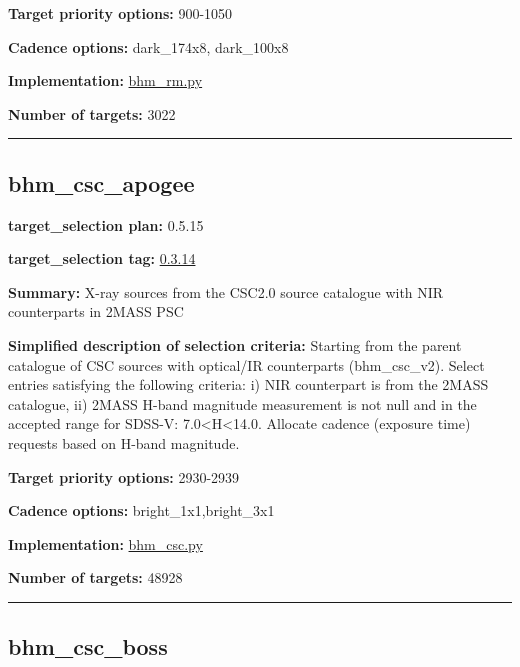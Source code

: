 \noindent\textbf{Target priority options:} 900-1050

\noindent\textbf{Cadence options:} dark\_174x8, dark\_100x8

\noindent\textbf{Implementation:}
\href{https://github.com/sdss/target_selection/blob/0.3.0/python/target_selection/cartons/bhm_rm.py}{bhm\_rm.py}

\noindent\textbf{Number of targets:} 3022

\begin{center}\rule{0.5\linewidth}{0.5pt}\end{center}

\hypertarget{bhm_csc_apogee_plan0.5.15}{%
\subsection{bhm\_csc\_apogee}\label{bhm_csc_apogee_plan0.5.15}}

\noindent\textbf{target\_selection plan:} 0.5.15

\noindent\textbf{target\_selection tag:}
\href{https://github.com/sdss/target_selection/tree/0.3.14/}{0.3.14}

\noindent\textbf{Summary:} X-ray sources from the CSC2.0 source catalogue with
NIR counterparts in 2MASS PSC

\noindent\textbf{Simplified description of selection criteria:} Starting from the
parent catalogue of CSC sources with optical/IR counterparts
(bhm\_csc\_v2). Select entries satisfying the following criteria: i) NIR
counterpart is from the 2MASS catalogue, ii) 2MASS H-band magnitude
measurement is not null and in the accepted range for SDSS-V:
7.0\textless H\textless14.0. Allocate cadence (exposure time) requests
based on H-band magnitude.


\noindent\textbf{Target priority options:} 2930-2939

\noindent\textbf{Cadence options:} bright\_1x1,bright\_3x1

\noindent\textbf{Implementation:}
\href{https://github.com/sdss/target_selection/blob/0.3.14/python/target_selection/cartons/bhm_csc.py}{bhm\_csc.py}

\noindent\textbf{Number of targets:} 48928

\begin{center}\rule{0.5\linewidth}{0.5pt}\end{center}

\hypertarget{bhm_csc_boss_plan0.5.15}{%
\subsection{bhm\_csc\_boss}\label{bhm_csc_boss_plan0.5.15}}


